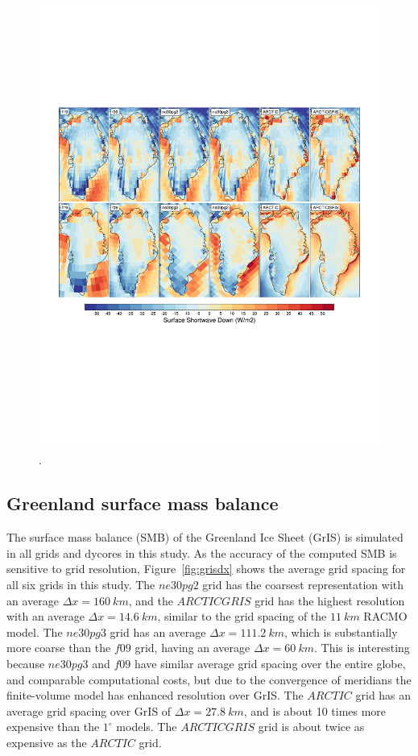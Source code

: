 \documentclass[draft]{agujournal2019}
\begin{document}
\begin{figure}[t]
\begin{center}
         \includegraphics[width=130mm]{figs/temp_contours_diffCERESdiffRACMO_FSDS.pdf}
\end{center}
\caption{.}
\label{fig:FSDS}
\end{figure}

\subsection{Greenland surface mass balance}

The surface mass balance (SMB) of the Greenland Ice Sheet (GrIS) is simulated in all grids and dycores in this study. As the accuracy of the computed SMB is sensitive to grid resolution, Figure~\ref{fig:grisdx} shows the average grid spacing for all six grids in this study. The $ne30pg2$ grid has the coarsest representation with an average $\Delta x=160~km$, and the $ARCTICGRIS$ grid has the highest resolution with an average $\Delta x=14.6~km$, similar to the grid spacing of the $11~km$ RACMO model. The $ne30pg3$ grid has an average $\Delta x=111.2~km$, which is substantially more coarse than the $f09$ grid, having an average $\Delta x=60~km$. This is interesting because $ne30pg3$ and $f09$ have similar average grid spacing over the entire globe, and comparable computational costs, but due to the convergence of meridians the finite-volume model has enhanced resolution over GrIS. The $ARCTIC$ grid has an average grid spacing over GrIS of $\Delta x=27.8~km$, and is about 10 times more expensive than the $1^{\circ}$ models. The $ARCTICGRIS$ grid is about twice as expensive as the $ARCTIC$ grid.
\end{document}
